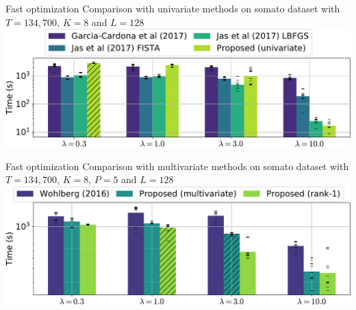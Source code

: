 \documentclass{beamer}
\begin{document}
\begin{frame}{Fast optimization}
Comparison with univariate methods on somato dataset with $T=134,700$, $K=8$ and $L=128$\\[1em]
\includegraphics[width=\textwidth]{all_last_0001_T_13470_P1_K8_L128}
\end{frame}

\begin{frame}{Fast optimization}
Comparison with multivariate methods on somato dataset with $T=134,700$, $K=8$, $P=5$ and $L=128$\\[1em]
\includegraphics[width=\textwidth]{all_last_0001_T_13470_P5_K8_L128}
\end{frame}
\end{document}

